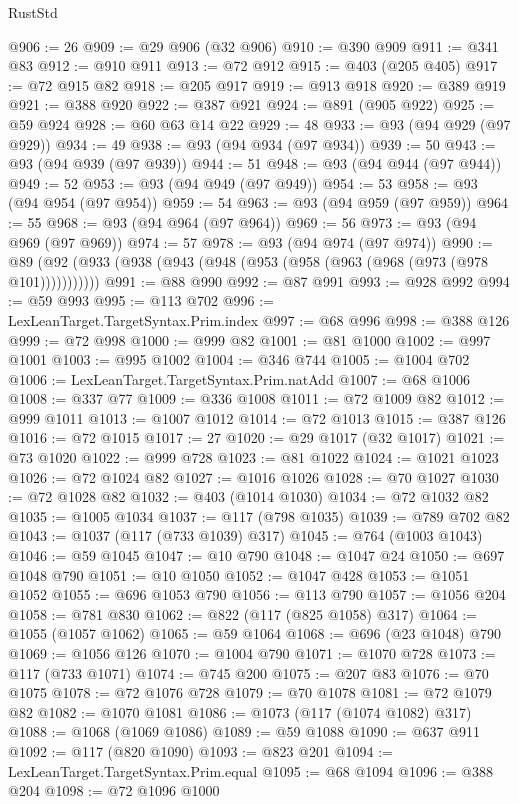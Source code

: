 \begin{lexlean}{RustStd}
\begin{coremodule}
@906 := 26
@909 := @29 @906 (@32 @906)
@910 := @390 @909
@911 := @341 @83
@912 := @910 @911
@913 := @72 @912
@915 := @403 (@205 @405)
@917 := @72 @915 @82
@918 := @205 @917
@919 := @913 @918
@920 := @389 @919
@921 := @388 @920
@922 := @387 @921
@924 := @891 (@905 @922)
@925 := @59 @924
@928 := @60 @63 @14 @22
@929 := 48
@933 := @93 (@94 @929 (@97 @929))
@934 := 49
@938 := @93 (@94 @934 (@97 @934))
@939 := 50
@943 := @93 (@94 @939 (@97 @939))
@944 := 51
@948 := @93 (@94 @944 (@97 @944))
@949 := 52
@953 := @93 (@94 @949 (@97 @949))
@954 := 53
@958 := @93 (@94 @954 (@97 @954))
@959 := 54
@963 := @93 (@94 @959 (@97 @959))
@964 := 55
@968 := @93 (@94 @964 (@97 @964))
@969 := 56
@973 := @93 (@94 @969 (@97 @969))
@974 := 57
@978 := @93 (@94 @974 (@97 @974))
@990 := @89 (@92 (@933 (@938 (@943 (@948 (@953 (@958 (@963 (@968 (@973 (@978 @101)))))))))))
@991 := @88 @990
@992 := @87 @991
@993 := @928 @992
@994 := @59 @993
@995 := @113 @702
@996 := LexLeanTarget.TargetSyntax.Prim.index
@997 := @68 @996
@998 := @388 @126
@999 := @72 @998
@1000 := @999 @82
@1001 := @81 @1000
@1002 := @997 @1001
@1003 := @995 @1002
@1004 := @346 @744
@1005 := @1004 @702
@1006 := LexLeanTarget.TargetSyntax.Prim.natAdd
@1007 := @68 @1006
@1008 := @337 @77
@1009 := @336 @1008
@1011 := @72 @1009 @82
@1012 := @999 @1011
@1013 := @1007 @1012
@1014 := @72 @1013
@1015 := @387 @126
@1016 := @72 @1015
@1017 := 27
@1020 := @29 @1017 (@32 @1017)
@1021 := @73 @1020
@1022 := @999 @728
@1023 := @81 @1022
@1024 := @1021 @1023
@1026 := @72 @1024 @82
@1027 := @1016 @1026
@1028 := @70 @1027
@1030 := @72 @1028 @82
@1032 := @403 (@1014 @1030)
@1034 := @72 @1032 @82
@1035 := @1005 @1034
@1037 := @117 (@798 @1035)
@1039 := @789 @702 @82
@1043 := @1037 (@117 (@733 @1039) @317)
@1045 := @764 (@1003 @1043)
@1046 := @59 @1045
@1047 := @10 @790
@1048 := @1047 @24
@1050 := @697 @1048 @790
@1051 := @10 @1050
@1052 := @1047 @428
@1053 := @1051 @1052
@1055 := @696 @1053 @790
@1056 := @113 @790
@1057 := @1056 @204
@1058 := @781 @830
@1062 := @822 (@117 (@825 @1058) @317)
@1064 := @1055 (@1057 @1062)
@1065 := @59 @1064
@1068 := @696 (@23 @1048) @790
@1069 := @1056 @126
@1070 := @1004 @790
@1071 := @1070 @728
@1073 := @117 (@733 @1071)
@1074 := @745 @200
@1075 := @207 @83
@1076 := @70 @1075
@1078 := @72 @1076 @728
@1079 := @70 @1078
@1081 := @72 @1079 @82
@1082 := @1070 @1081
@1086 := @1073 (@117 (@1074 @1082) @317)
@1088 := @1068 (@1069 @1086)
@1089 := @59 @1088
@1090 := @637 @911
@1092 := @117 (@820 @1090)
@1093 := @823 @201
@1094 := LexLeanTarget.TargetSyntax.Prim.equal
@1095 := @68 @1094
@1096 := @388 @204
@1098 := @72 @1096 @1000

\end{coremodule}
\end{lexlean}
